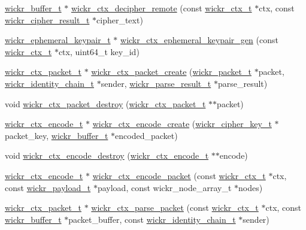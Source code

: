 \begin{DoxyCompactItemize}
\item 
\hyperlink{structwickr__buffer}{wickr\+\_\+buffer\+\_\+t} $\ast$ \hyperlink{group__wickr__ctx_gacc1038d3690ba4860b74f13239c65600}{wickr\+\_\+ctx\+\_\+decipher\+\_\+remote} (const \hyperlink{structwickr__ctx}{wickr\+\_\+ctx\+\_\+t} $\ast$ctx, const \hyperlink{structwickr__cipher__result}{wickr\+\_\+cipher\+\_\+result\+\_\+t} $\ast$cipher\+\_\+text)
\item 
\hyperlink{structwickr__ephemeral__keypair}{wickr\+\_\+ephemeral\+\_\+keypair\+\_\+t} $\ast$ \hyperlink{group__wickr__ctx_ga45b2531085c430942122dcbf45736e10}{wickr\+\_\+ctx\+\_\+ephemeral\+\_\+keypair\+\_\+gen} (const \hyperlink{structwickr__ctx}{wickr\+\_\+ctx\+\_\+t} $\ast$ctx, uint64\+\_\+t key\+\_\+id)
\item 
\hyperlink{structwickr__ctx__packet}{wickr\+\_\+ctx\+\_\+packet\+\_\+t} $\ast$ \hyperlink{group__wickr__ctx_ga8ac1e1c9a0b9802d7f259278a09df56c}{wickr\+\_\+ctx\+\_\+packet\+\_\+create} (\hyperlink{structwickr__packet}{wickr\+\_\+packet\+\_\+t} $\ast$packet, \hyperlink{structwickr__identity__chain}{wickr\+\_\+identity\+\_\+chain\+\_\+t} $\ast$sender, \hyperlink{structwickr__parse__result}{wickr\+\_\+parse\+\_\+result\+\_\+t} $\ast$parse\+\_\+result)
\item 
void \hyperlink{group__wickr__ctx_gad7063bcfca4878d290e598ed6bc22e3c}{wickr\+\_\+ctx\+\_\+packet\+\_\+destroy} (\hyperlink{structwickr__ctx__packet}{wickr\+\_\+ctx\+\_\+packet\+\_\+t} $\ast$$\ast$packet)
\item 
\hyperlink{structwickr__ctx__encode}{wickr\+\_\+ctx\+\_\+encode\+\_\+t} $\ast$ \hyperlink{group__wickr__ctx_ga810ee459cb0ab1037b5fd1f983d0ded3}{wickr\+\_\+ctx\+\_\+encode\+\_\+create} (\hyperlink{structwickr__cipher__key}{wickr\+\_\+cipher\+\_\+key\+\_\+t} $\ast$packet\+\_\+key, \hyperlink{structwickr__buffer}{wickr\+\_\+buffer\+\_\+t} $\ast$encoded\+\_\+packet)
\item 
void \hyperlink{group__wickr__ctx_ga9ed3f7c0f4d672a2ac562b279e2da4e1}{wickr\+\_\+ctx\+\_\+encode\+\_\+destroy} (\hyperlink{structwickr__ctx__encode}{wickr\+\_\+ctx\+\_\+encode\+\_\+t} $\ast$$\ast$encode)
\item 
\hyperlink{structwickr__ctx__encode}{wickr\+\_\+ctx\+\_\+encode\+\_\+t} $\ast$ \hyperlink{group__wickr__ctx_ga3766720fd6654fad791a26cd2c1161b7}{wickr\+\_\+ctx\+\_\+encode\+\_\+packet} (const \hyperlink{structwickr__ctx}{wickr\+\_\+ctx\+\_\+t} $\ast$ctx, const \hyperlink{structwickr__payload}{wickr\+\_\+payload\+\_\+t} $\ast$payload, const wickr\+\_\+node\+\_\+array\+\_\+t $\ast$nodes)
\item 
\hyperlink{structwickr__ctx__packet}{wickr\+\_\+ctx\+\_\+packet\+\_\+t} $\ast$ \hyperlink{group__wickr__ctx_ga5032fb65627a509fd9486ea9696e643d}{wickr\+\_\+ctx\+\_\+parse\+\_\+packet} (const \hyperlink{structwickr__ctx}{wickr\+\_\+ctx\+\_\+t} $\ast$ctx, const \hyperlink{structwickr__buffer}{wickr\+\_\+buffer\+\_\+t} $\ast$packet\+\_\+buffer, const \hyperlink{structwickr__identity__chain}{wickr\+\_\+identity\+\_\+chain\+\_\+t} $\ast$sender)
\end{DoxyCompactItemize}


